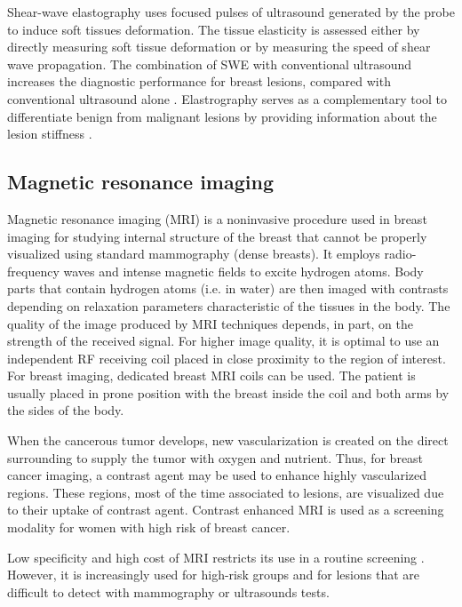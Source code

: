 Shear-wave elastography uses focused pulses of ultrasound generated by the probe to induce soft tissues deformation. The tissue elasticity is assessed either by directly measuring soft tissue deformation or by measuring the speed of shear wave propagation. The combination of SWE with conventional ultrasound
increases the diagnostic performance for breast lesions, compared
with conventional ultrasound alone \citep{youk_shear_2017}.  Elastrography serves as a complementary tool to differentiate benign from malignant lesions by providing information about the lesion stiffness \citep{itoh_breast_2006,olgun_use_2014}.
 
\subsection{Magnetic resonance imaging}\label{subsection:mri}

Magnetic resonance imaging (MRI) is a noninvasive procedure used in breast imaging for studying internal structure of the breast that cannot be properly visualized using standard mammography (dense breasts).  It employs radio-frequency waves and intense magnetic fields to excite hydrogen atoms. Body parts that contain hydrogen atoms (i.e. in water) are then imaged with contrasts depending on relaxation parameters characteristic of the tissues in the body. The quality of the image produced by MRI techniques depends, in part, on the strength of the received signal. For higher image quality, it is optimal to use an independent RF receiving coil placed in close proximity to the region of interest.  For breast imaging, dedicated breast MRI coils can be used. The patient is usually placed in prone position with the breast inside the coil and both arms by the sides of the body.

When the cancerous tumor develops, new vascularization is created on the direct surrounding to supply the tumor with oxygen and nutrient.
Thus, for breast cancer imaging, a contrast agent may be used to enhance highly vascularized regions. These regions, most of the time associated to lesions, are visualized due to their uptake of contrast agent. Contrast enhanced MRI is used as a screening modality for women with high risk of breast cancer.  

Low specificity and high cost of MRI restricts its use in a routine screening \citep{peters_meta_2008}. However, it is increasingly used for high-risk groups and for lesions that are difficult to detect with mammography or ultrasounds tests. 

